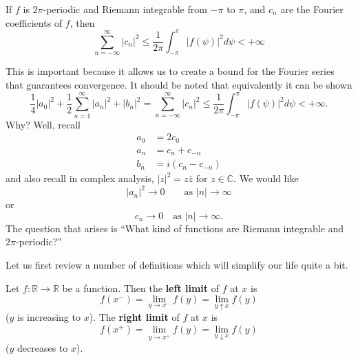 %
%
%

\begin{bessel}
If $f$ is $2\pi$-periodic and Riemann integrable from $-\pi$
to $\pi$, and $c_n$ are the Fourier coefficients of $f$,
then 
\begin{equation}
\sum^{\infty}_{n=-\infty}|c_{n}|^2\leq\frac{1}{2\pi}\int^{\pi}_{-\pi}|f(\psi)|^2d\psi
< +\infty
\end{equation}
\end{bessel}

This is important because it allows us to create a bound for
the Fourier series that guarantees convergence. It should be
noted that equivalently it can be shown
\begin{equation}
\frac{1}{4}|a_0|^2 + \frac{1}{2}\sum^{\infty}_{n=1}|a_{n}|^2
+ |b_{n}|^{2} = \sum^{\infty}_{n=-\infty}|c_{n}|^{2} \leq \frac{1}{2\pi}\int^{\pi}_{-\pi}|f(\psi)|^2d\psi< +\infty.
\end{equation}
Why? Well, recall
\begin{subequations}
\begin{align}
a_{0} &= 2c_{0} \\
a_{n} &= c_{n} + c_{-n} \\ 
b_{n} &= i(c_{n}-c_{-n})
\end{align}
\end{subequations}
and also recall in complex analysis, $|z|^2 = z\bar{z}$ for
$z\in\mathbb{C}$. We would like
\begin{equation}
|a_{n}|^{2}\to 0\qquad\text{as } |n|\to\infty
\end{equation}
or
\begin{equation}\label{eq:4April2008:F1}
c_{n}\to 0\quad\text{as }|n|\to\infty.
\end{equation}
The question
that arises is ``What kind of functions are Riemann
integrable and $2\pi$-periodic?''

Let us first review a number of definitions which will
simplify our life quite a bit.

\begin{defn} 
Let $f:\mathbb{R}\to\mathbb{R}$ be a function. Then the
\textbf{left limit} of $f$ at $x$ is
\begin{equation}
f(x^{-}) = \lim_{y\to x^{-}}f(y) = \lim_{y\uparrow x}f(y) 
\end{equation}
($y$ is increasing to $x$). The \textbf{right
  limit} of $f$ at $x$ is
\begin{equation}
f(x^{+}) = \lim_{y\to x^{+}}f(y) = \lim_{y\downarrow x}f(y)
\end{equation}
($y$ decreases to $x$).
\end{defn}

